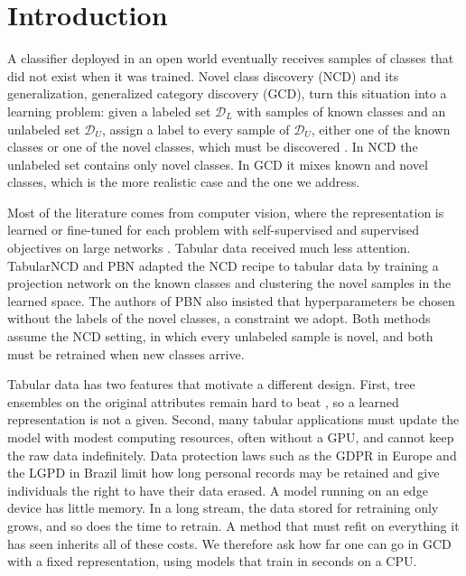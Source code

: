\documentclass[pdflatex,sn-basic]{sn-jnl}
\newcommand{\DL}{\mathcal{D}_L}
\newcommand{\DU}{\mathcal{D}_U}
\begin{document}
\section{Introduction}\label{sec:intro}

A classifier deployed in an open world eventually receives samples of classes that did not exist when it was trained. Novel class discovery (NCD) and its generalization, generalized category discovery (GCD), turn this situation into a learning problem: given a labeled set $\DL$ with samples of known classes and an unlabeled set $\DU$, assign a label to every sample of $\DU$, either one of the known classes or one of the novel classes, which must be discovered \citep{hsu2018kcl,han2019dtc,vaze2022gcd}. In NCD the unlabeled set contains only novel classes. In GCD it mixes known and novel classes, which is the more realistic case and the one we address.

Most of the literature comes from computer vision, where the representation is learned or fine-tuned for each problem with self-supervised and supervised objectives on large networks \citep{fini2021uno,vaze2022gcd,wen2023simgcd}. Tabular data received much less attention. TabularNCD \citep{troisemaine2022tabularncd} and PBN \citep{troisemaine2024pbn} adapted the NCD recipe to tabular data by training a projection network on the known classes and clustering the novel samples in the learned space. The authors of PBN also insisted that hyperparameters be chosen without the labels of the novel classes, a constraint we adopt. Both methods assume the NCD setting, in which every unlabeled sample is novel, and both must be retrained when new classes arrive.

Tabular data has two features that motivate a different design. First, tree ensembles on the original attributes remain hard to beat \citep{grinsztajn2022tabular}, so a learned representation is not a given. Second, many tabular applications must update the model with modest computing resources, often without a GPU, and cannot keep the raw data indefinitely. Data protection laws such as the GDPR in Europe and the LGPD in Brazil limit how long personal records may be retained and give individuals the right to have their data erased. A model running on an edge device has little memory. In a long stream, the data stored for retraining only grows, and so does the time to retrain. A method that must refit on everything it has seen inherits all of these costs. We therefore ask how far one can go in GCD with a fixed representation, using models that train in seconds on a CPU.
\end{document}
